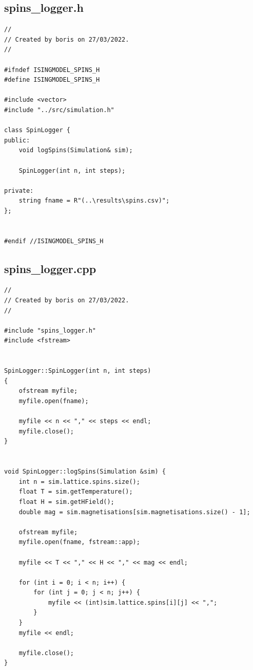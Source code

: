 \documentclass[a4paper, 12pt]{article}
\begin{document}
\newpage
\subsection{spins\_logger.h}
\begin{lstlisting}
//
// Created by boris on 27/03/2022.
//

#ifndef ISINGMODEL_SPINS_H
#define ISINGMODEL_SPINS_H

#include <vector>
#include "../src/simulation.h"

class SpinLogger {
public:
    void logSpins(Simulation& sim);

    SpinLogger(int n, int steps);

private:
    string fname = R"(..\results\spins.csv)";
};


#endif //ISINGMODEL_SPINS_H
\end{lstlisting}


\newpage
\subsection{spins\_logger.cpp}
\begin{lstlisting}
//
// Created by boris on 27/03/2022.
//

#include "spins_logger.h"
#include <fstream>


SpinLogger::SpinLogger(int n, int steps)
{
    ofstream myfile;
    myfile.open(fname);

    myfile << n << "," << steps << endl;
    myfile.close();
}


void SpinLogger::logSpins(Simulation &sim) {
    int n = sim.lattice.spins.size();
    float T = sim.getTemperature();
    float H = sim.getHField();
    double mag = sim.magnetisations[sim.magnetisations.size() - 1];

    ofstream myfile;
    myfile.open(fname, fstream::app);

    myfile << T << "," << H << "," << mag << endl;

    for (int i = 0; i < n; i++) {
        for (int j = 0; j < n; j++) {
            myfile << (int)sim.lattice.spins[i][j] << ",";
        }
    }
    myfile << endl;

    myfile.close();
}

\end{lstlisting}



\newpage
\end{document}
